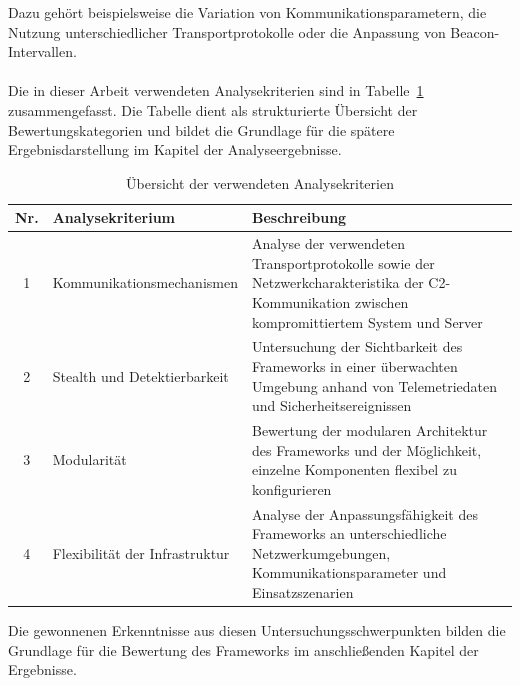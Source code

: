 Dazu gehört beispielsweise die Variation von Kommunikationsparametern, die Nutzung unterschiedlicher Transportprotokolle oder die Anpassung von Beacon-Intervallen.
\\\\
Die in dieser Arbeit verwendeten Analysekriterien sind in Tabelle~\ref{tab:analyse_kriterien} zusammengefasst. 
Die Tabelle dient als strukturierte Übersicht der Bewertungskategorien und bildet die Grundlage für die spätere Ergebnisdarstellung im Kapitel der Analyseergebnisse.
\begin{table}[H]
\centering
\begin{tabularx}{\textwidth}{|c|X|X|}
\hline
\textbf{Nr.} & \textbf{Analysekriterium} & \textbf{Beschreibung} \\
\hline
1 & Kommunikationsmechanismen & Analyse der verwendeten Transportprotokolle sowie der Netzwerkcharakteristika der C2-Kommunikation zwischen kompromittiertem System und Server \\
\hline
2 & Stealth und Detektierbarkeit & Untersuchung der Sichtbarkeit des Frameworks in einer überwachten Umgebung anhand von Telemetriedaten und Sicherheitsereignissen \\
\hline
3 & Modularität & Bewertung der modularen Architektur des Frameworks und der Möglichkeit, einzelne Komponenten flexibel zu konfigurieren \\
\hline
4 & Flexibilität der Infrastruktur & Analyse der Anpassungsfähigkeit des Frameworks an unterschiedliche Netzwerkumgebungen, Kommunikationsparameter und Einsatzszenarien \\
\hline
\end{tabularx}
\caption{Übersicht der verwendeten Analysekriterien}
\label{tab:analyse_kriterien}
\end{table}
Die gewonnenen Erkenntnisse aus diesen Untersuchungsschwerpunkten bilden die Grundlage für die Bewertung des Frameworks im anschließenden Kapitel der Ergebnisse.
\newpage
